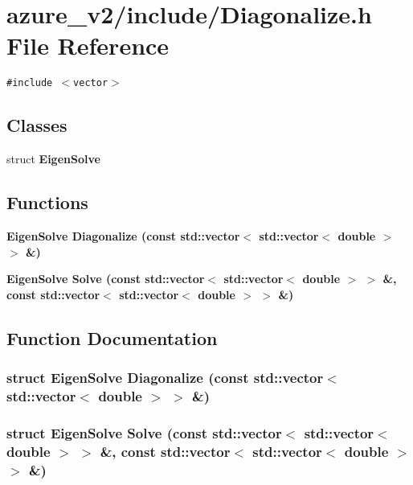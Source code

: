 \section{azure\_\-v2/include/Diagonalize.h File Reference}
\label{Diagonalize_8h}
{\tt \#include $<$vector$>$}\par
\subsection*{Classes}
\begin{CompactItemize}
\item 
struct \bf{Eigen\-Solve}
\end{CompactItemize}
\subsection*{Functions}
\begin{CompactItemize}
\item 
\bf{Eigen\-Solve} \bf{Diagonalize} (const std::vector$<$ std::vector$<$ double $>$ $>$ \&)
\item 
\bf{Eigen\-Solve} \bf{Solve} (const std::vector$<$ std::vector$<$ double $>$ $>$ \&, const std::vector$<$ std::vector$<$ double $>$ $>$ \&)
\end{CompactItemize}


\subsection{Function Documentation}
\subsubsection{\setlength{\rightskip}{0pt plus 5cm}struct \bf{Eigen\-Solve} Diagonalize (const std::vector$<$ std::vector$<$ double $>$ $>$ \&)}\label{Diagonalize_8h_d2203350de8a122a5ac46ab35a840b09}


\subsubsection{\setlength{\rightskip}{0pt plus 5cm}struct \bf{Eigen\-Solve} Solve (const std::vector$<$ std::vector$<$ double $>$ $>$ \&, const std::vector$<$ std::vector$<$ double $>$ $>$ \&)}\label{Diagonalize_8h_fef263afa279fc5d315c726cc0c819c7}


